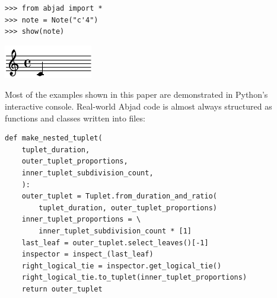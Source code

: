 \documentclass{article}
\begin{document}

\begin{lstlisting}
>>> from abjad import *
>>> note = Note("c'4")
>>> show(note)
\end{lstlisting}
\includegraphics{assets/lilypond-c018a545d264ff34225e9a3a5babb6c1.pdf}

\noindent Most of the examples shown in this paper are demonstrated in Python's
interactive console. Real-world Abjad code is almost always
structured as functions and classes written into files:

\begin{lstlisting}
def make_nested_tuplet(
    tuplet_duration,
    outer_tuplet_proportions,
    inner_tuplet_subdivision_count,
    ):
    outer_tuplet = Tuplet.from_duration_and_ratio(
        tuplet_duration, outer_tuplet_proportions)
    inner_tuplet_proportions = \
        inner_tuplet_subdivision_count * [1]
    last_leaf = outer_tuplet.select_leaves()[-1]
    inspector = inspect_(last_leaf)
    right_logical_tie = inspector.get_logical_tie()
    right_logical_tie.to_tuplet(inner_tuplet_proportions)
    return outer_tuplet
\end{lstlisting}

\end{document}
